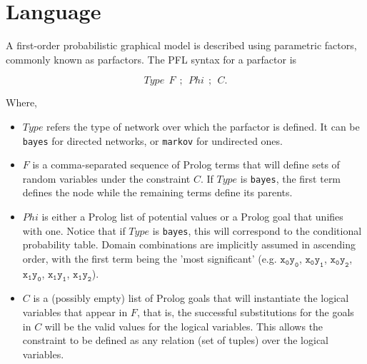 \documentclass{article}
\begin{document}
\section{Language}
A first-order probabilistic graphical model is described using parametric factors, commonly known as parfactors. The PFL syntax for a parfactor is

$$Type~~F~~;~~Phi~~;~~C.$$

Where,
\begin{itemize}
\item $Type$ refers the type of network over which the parfactor is defined. It can be \texttt{bayes} for directed networks, or \texttt{markov} for undirected ones.

\item $F$ is a comma-separated sequence of Prolog terms that will define sets of random variables under the constraint $C$. If $Type$ is \texttt{bayes}, the first term defines the node while the remaining terms define its parents.

\item $Phi$ is either a Prolog list of potential values or a Prolog goal that unifies with one. Notice that if $Type$ is \texttt{bayes}, this will correspond to the conditional probability table. Domain combinations are implicitly assumed in ascending order, with the first term being the 'most significant' (e.g. $\mathtt{x_0y_0}$, $\mathtt{x_0y_1}$, $\mathtt{x_0y_2}$, $\mathtt{x_1y_0}$, $\mathtt{x_1y_1}$, $\mathtt{x_1y_2}$).

\item $C$ is a (possibly empty) list of Prolog goals that will instantiate the logical variables that appear in $F$, that is, the successful substitutions for the goals in $C$ will be the valid values for the logical variables. This allows the constraint to be defined as any relation (set of tuples) over the logical variables.
\end{itemize}
\end{document}
